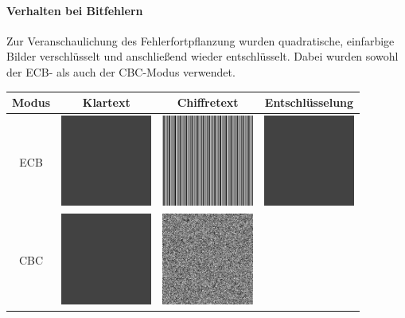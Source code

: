 \paragraph{Verhalten bei Bitfehlern}
Zur Veranschaulichung des Fehlerfortpflanzung wurden quadratische, einfarbige Bilder verschlüsselt und anschließend wieder entschlüsselt. Dabei wurden sowohl der ECB- als auch der CBC-Modus verwendet.
\begin{table}
    \begin{center}
        \begin{tabular}{|c|c|c|c|}
        \hline
        Modus & Klartext & Chiffretext & Entschlüsselung \\
        \hline
        ECB &
        \includegraphics[width=3cm]{img/no_error/original} &
        \includegraphics[width=3cm]{img/no_error/output_ECM} &
        \includegraphics[width=3cm]{img/no_error/output_ECM_decrypt} \\
        \hline
        CBC &
        \includegraphics[width=3cm]{img/no_error/original} &
        \includegraphics[width=3cm]{img/no_error/output_CBC} &

\end{tabular}
\end{center}
\end{table}
